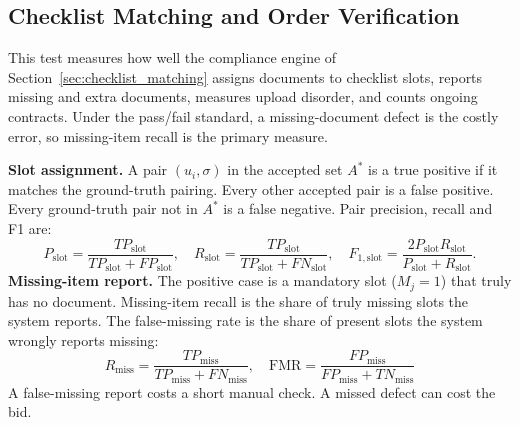 \subsection{Checklist Matching and Order Verification}
\label{sec:eval_checklist_matching}

This test measures how well the compliance engine of Section~\ref{sec:checklist_matching} assigns documents to checklist slots, reports missing and extra documents, measures upload disorder, and counts ongoing contracts. Under the pass/fail standard, a missing-document defect is the costly error, so missing-item recall is the primary measure.

\textbf{Slot assignment.} A pair $(u_i,\sigma)$ in the accepted set $A^*$ is a true positive if it matches the ground-truth pairing. Every other accepted pair is a false positive. Every ground-truth pair not in $A^*$ is a false negative. Pair precision, recall and F1 are:
\begin{equation}
\label{eq:slot_metrics}
P_{\mathrm{slot}}=\frac{TP_{\mathrm{slot}}}{TP_{\mathrm{slot}}+FP_{\mathrm{slot}}},\quad
R_{\mathrm{slot}}=\frac{TP_{\mathrm{slot}}}{TP_{\mathrm{slot}}+FN_{\mathrm{slot}}},\quad
F_{1,\mathrm{slot}}=\frac{2P_{\mathrm{slot}}R_{\mathrm{slot}}}{P_{\mathrm{slot}}+R_{\mathrm{slot}}}.
\end{equation}
\textbf{Missing-item report.} The positive case is a mandatory slot ($M_j = 1$) that truly has no document. Missing-item recall is the share of truly missing slots the system reports. The false-missing rate is the share of present slots the system wrongly reports missing:
\begin{equation}
\label{eq:missing_item_metrics}
R_{\text{miss}} = \frac{TP_{\text{miss}}}{TP_{\text{miss}} + FN_{\text{miss}}}, \quad \text{FMR} = \frac{FP_{\text{miss}}}{FP_{\text{miss}} + TN_{\text{miss}}}
\end{equation}
A false-missing report costs a short manual check. A missed defect can cost the bid.

